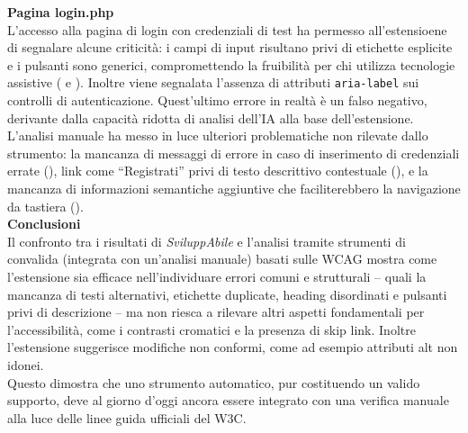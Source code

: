 \noindent \textbf{Pagina login.php}\\
L’accesso alla pagina di login con credenziali di test ha permesso all'estensioene di segnalare alcune criticità: i campi di input risultano privi di etichette esplicite e i pulsanti sono generici, compromettendo la fruibilità per chi utilizza tecnologie assistive ({} e {}). Inoltre viene segnalata l'assenza di attributi \texttt{aria-label} sui controlli di autenticazione. Quest'ultimo errore in realtà è un falso negativo, derivante dalla capacità ridotta di analisi dell'IA alla base dell'estensione.\\
L’analisi manuale ha messo in luce ulteriori problematiche non rilevate dallo strumento: la mancanza di messaggi di errore in caso di inserimento di credenziali errate ({}), link come “Registrati” privi di testo descrittivo contestuale ({}), e la mancanza di informazioni semantiche aggiuntive che faciliterebbero la navigazione da tastiera ({}). \\

\noindent \textbf{Conclusioni}\\
Il confronto tra i risultati di \textit{SviluppAbile} e l’analisi tramite strumenti di convalida (integrata con un'analisi manuale) basati sulle WCAG mostra come l’estensione sia efficace nell’individuare errori comuni e strutturali – quali la mancanza di testi alternativi, etichette duplicate, heading disordinati e pulsanti privi di descrizione – ma non riesca a rilevare altri aspetti fondamentali per l’accessibilità, come i contrasti cromatici e la presenza di skip link. Inoltre l'estensione suggerisce modifiche non conformi, come ad esempio attributi alt non idonei.\\
Questo dimostra che uno strumento automatico, pur costituendo un valido supporto, deve al giorno d'oggi ancora essere integrato con una verifica manuale alla luce delle linee guida ufficiali del W3C.

